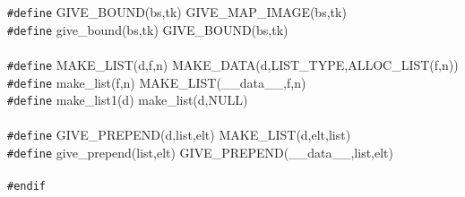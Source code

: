 \begin{flushleft}
{\tt \#define} GIVE\_BOUND(bs,tk) GIVE\_MAP\_IMAGE(bs,tk)\mbox{}\\
{\tt \#define} give\_bound(bs,tk) GIVE\_BOUND(bs,tk)\mbox{}\\
\mbox{}\\
{\tt \#define} MAKE\_LIST(d,f,n) MAKE\_DATA(d,LIST\_TYPE,ALLOC\_LIST(f,n))\mbox{}\\
{\tt \#define} make\_list(f,n) MAKE\_LIST(\_\_data\_\_,f,n)\mbox{}\\
{\tt \#define} make\_list1(d) make\_list(d,NULL)\mbox{}\\
\mbox{}\\
{\tt \#define} GIVE\_PREPEND(d,list,elt) MAKE\_LIST(d,elt,list)\mbox{}\\
{\tt \#define} give\_prepend(list,elt) GIVE\_PREPEND(\_\_data\_\_,list,elt)\mbox{}\\
\mbox{}\\
{\tt \#endif}\mbox{}\\
\end{flushleft}

